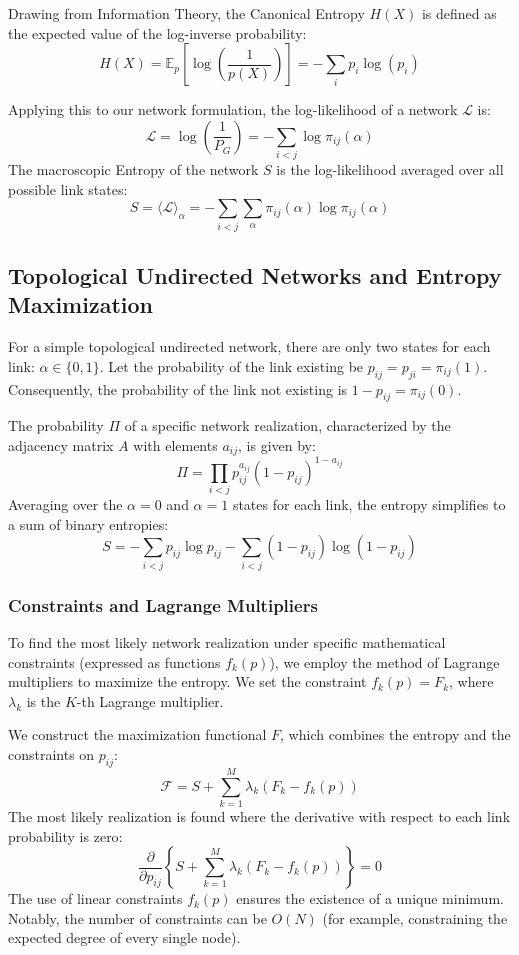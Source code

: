 Drawing from Information Theory, the Canonical Entropy \(H(X)\) is defined as the expected value of the log-inverse probability:
\[
    H(X) = \mathbb{E}_p \left[ \log\left(\frac{1}{p(X)}\right) \right] = - \sum_{i} p_i \log(p_i)
\]

Applying this to our network formulation, the log-likelihood of a network \(\mathcal{L}\) is:
\[
    \mathcal{L} = \log\left(\frac{1}{P_G}\right) = - \sum_{i<j} \log \pi_{ij}(\alpha)
\]
The macroscopic Entropy of the network \(S\) is the log-likelihood averaged over all possible link states:
\[
    S = \langle \mathcal{L} \rangle_\alpha = - \sum_{i<j} \sum_{\alpha} \pi_{ij}(\alpha) \log \pi_{ij}(\alpha)
\]

\subsection{Topological Undirected Networks and Entropy Maximization}
\label{subsec:topological_undirected}

For a simple topological undirected network, there are only two states for each link: \(\alpha \in \{0, 1\}\). Let the probability of the link existing be \(p_{ij} = p_{ji} = \pi_{ij}(1)\). Consequently, the probability of the link not existing is \(1 - p_{ij} = \pi_{ij}(0)\).

The probability \(\Pi\) of a specific network realization, characterized by the adjacency matrix \(A\) with elements \(a_{ij}\), is given by:
\[
    \Pi = \prod_{i<j} p_{ij}^{a_{ij}} (1 - p_{ij})^{1 - a_{ij}}
\]
Averaging over the \(\alpha = 0\) and \(\alpha = 1\) states for each link, the entropy simplifies to a sum of binary entropies:
\[
    S = - \sum_{i<j} p_{ij} \log p_{ij} - \sum_{i<j} (1 - p_{ij}) \log(1 - p_{ij})
\]

\subsubsection{Constraints and Lagrange Multipliers}
\label{subsubsec:lagrange_multipliers}

To find the most likely network realization under specific mathematical constraints (expressed as functions \(f_k(p)\)), we employ the method of Lagrange multipliers to maximize the entropy. We set the constraint \(f_k(p) = F_k\), where \(\lambda_k\) is the \(K\)-th Lagrange multiplier.

We construct the maximization functional \(F\), which combines the entropy and the constraints on \(p_{ij}\):
\[
    \mathcal{F} = S + \sum_{k=1}^{M} \lambda_k (F_k - f_k(p))
\]
The most likely realization is found where the derivative with respect to each link probability is zero:
\[
    \frac{\partial}{\partial p_{ij}} \left\{ S + \sum_{k=1}^{M} \lambda_k (F_k - f_k(p)) \right\} = 0
\]
The use of linear constraints \(f_k(p)\) ensures the existence of a unique minimum. Notably, the number of constraints can be \(O(N)\) (for example, constraining the expected degree of every single node).

